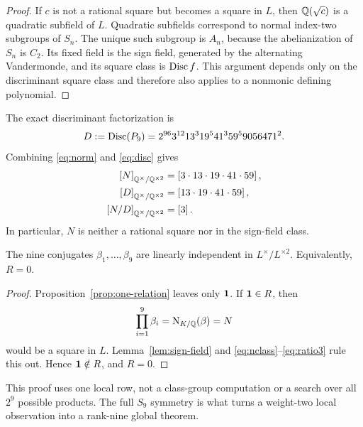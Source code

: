 \begin{proof}
If \(c\) is not a rational square but becomes a square in \(L\), then
\(\mathbb{Q}(\sqrt c)\) is a quadratic subfield of \(L\).  Quadratic subfields
correspond to normal index-two subgroups of \(S_n\).  The unique such
subgroup is \(A_n\), because the abelianization of \(S_n\) is \(C_2\).
Its fixed field is the sign field, generated by the alternating
Vandermonde, and its square class is \(\operatorname{Disc} f\).  This argument depends
only on the discriminant square class and therefore also applies to a
nonmonic defining polynomial.
\end{proof}

The exact discriminant factorization is
\begin{equation}
D:=\operatorname{Disc}(P_9)
=2^{96}3^{12}13^3 19^5 41^3 59^5 9056471^2.                \label{eq:disc}
\end{equation}
Combining \eqref{eq:norm} and \eqref{eq:disc} gives
\begin{align}
 \left[N\right]_{\mathbb{Q}^\times/\mathbb{Q}^{\times2}}
   &=\left[3\cdot13\cdot19\cdot41\cdot59\right],              \label{eq:nclass}\\
 \left[D\right]_{\mathbb{Q}^\times/\mathbb{Q}^{\times2}}
   &=\left[13\cdot19\cdot41\cdot59\right],                    \label{eq:dclass}\\
 \left[N/D\right]_{\mathbb{Q}^\times/\mathbb{Q}^{\times2}}&=\left[3\right].        \label{eq:ratio3}
\end{align}
In particular, \(N\) is neither a rational square nor in the sign-field
class.

\begin{theorem}\label{thm:rank-nine}
The nine conjugates \(\beta_1,\ldots,\beta_9\) are linearly independent in
\(L^\times/L^{\times2}\).  Equivalently, \(R=0\).
\end{theorem}

\begin{proof}
Proposition~\ref{prop:one-relation} leaves only \(\mathbf{1}\).  If
\(\mathbf{1}\in R\), then
\[
 \prod_{i=1}^{9}\beta_i=\operatorname{N}_{K/\mathbb{Q}}(\beta)=N
\]
would be a square in \(L\).  Lemma~\ref{lem:sign-field} and
\eqref{eq:nclass}--\eqref{eq:ratio3} rule this out.  Hence
\(\mathbf{1}\notin R\), and \(R=0\).
\end{proof}

This proof uses one local row, not a class-group computation or a search
over all \(2^9\) possible products.  The full \(S_9\) symmetry is what
turns a weight-two local observation into a rank-nine global theorem.
